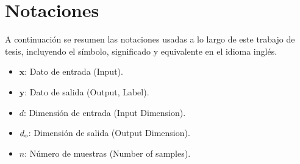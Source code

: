 \chapter{Notaciones}

A continuación se resumen las notaciones usadas a lo largo de este trabajo de tesis, incluyendo el símbolo,  significado y equivalente en el idioma inglés.

\begin{itemize}
    \item $\mathbf{x}$: Dato de entrada (Input).
    \item $\mathbf{y}$: Dato de salida (Output, Label).
    \item $d$: Dimensión de entrada (Input Dimension).
    \item $d_{\rm o}$: Dimensión de salida (Output Dimension).
    \item $n$: Número de muestras (Number of samples).
\end{itemize}
